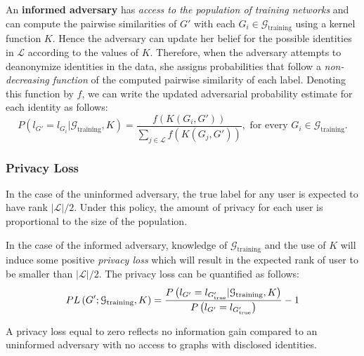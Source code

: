 An \textbf{informed adversary} has \emph{access to the population of training networks} and can compute the pairwise similarities of $ G' $ with each $ G_{i} \in \mathcal{G}_{\text{training}} $ using a kernel function $K$. Hence the adversary can update her belief for the possible identities in $ \mathcal{L} $ according to the values of $K$.
Therefore, when the adversary attempts to deanonymize identities in the data, she assigns probabilities that follow a \emph{non-decreasing function} {of the computed pairwise similarity} of each label.
Denoting this function by $f$, we can write the updated adversarial probability estimate for each identity as follows:
\[
	P\left(l_{G'} =l_{G_i}| \mathcal{G}_{\text{training}}, K\right) =  \frac{f\left(K(G_i, G')\right)}{\displaystyle \sum_{j\in \mathcal{L}}  f\left(K(G_j, G')\right)},   \mbox{ for every }  G_i \in \mathcal{G}_{\text{training}}.
	\label{eq:adversarial_rule}
\]




\subsubsection{Privacy Loss}

In the case of the uninformed adversary, the true label for any user is expected to have rank $ |\mathcal{L}|/2$. Under this policy, the amount of privacy for each user is proportional to the size of the population.

In the case of the informed adversary, knowledge of $ \mathcal{G}_\text{training} $ and the use of $ K $ will induce some positive \emph{privacy loss} which will result in the expected rank of user to be smaller than $ |\mathcal{L}|/2$. The privacy loss can be quantified as follows:
\[
	PL\left(G';\mathcal{G}_{\text{training}}, K\right) = \frac{P\left(l_{G'}= l_{G'_\text{true}}|\mathcal{G}_{\text{training}}, K\right)}{P\left(l_{G'}= l_{G'_\text{true}}\right)} -1
	\label{eq:privloss}
\]

A privacy loss equal to zero reflects no information gain compared to an uninformed adversary with no access to graphs with disclosed identities.

